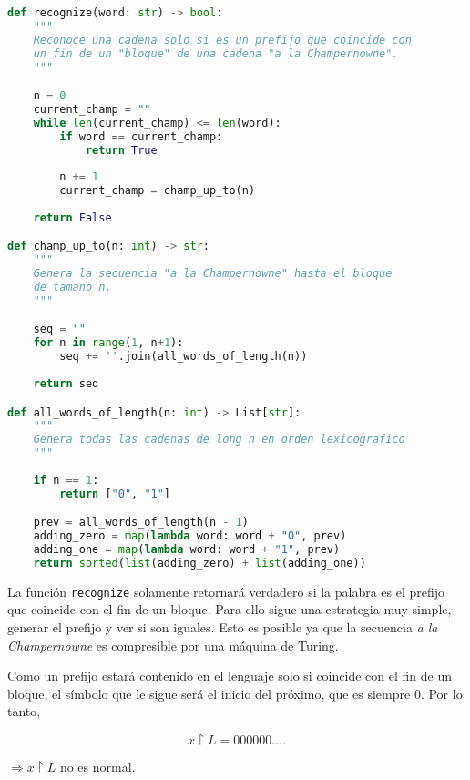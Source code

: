 \documentclass{article}
\theoremstyle{definition} %
\newcommand{\select}{\upharpoonright}
\begin{document}
\lstset{style=mystyle}

\begin{lstlisting}[language=Python, caption=Programa que reconoce las cadenas de $L$]
def recognize(word: str) -> bool:
    """
    Reconoce una cadena solo si es un prefijo que coincide con
    un fin de un "bloque" de una cadena "a la Champernowne".
    """

    n = 0
    current_champ = ""
    while len(current_champ) <= len(word):
        if word == current_champ:
            return True
        
        n += 1
        current_champ = champ_up_to(n)
    
    return False

def champ_up_to(n: int) -> str:
    """
    Genera la secuencia "a la Champernowne" hasta el bloque
    de tamano n.
    """

    seq = ""
    for n in range(1, n+1):
        seq += ''.join(all_words_of_length(n))
    
    return seq

def all_words_of_length(n: int) -> List[str]:
    """
    Genera todas las cadenas de long n en orden lexicografico
    """
    
    if n == 1:
        return ["0", "1"]

    prev = all_words_of_length(n - 1)
    adding_zero = map(lambda word: word + "0", prev)
    adding_one = map(lambda word: word + "1", prev)
    return sorted(list(adding_zero) + list(adding_one))
\end{lstlisting}
    
La función \texttt{recognize} solamente retornará verdadero si la palabra es el
prefijo que coincide con el fin de un bloque. Para ello sigue una estrategia muy
simple, generar el prefijo y ver si son iguales. Esto es posible ya que la
secuencia \textit{a la Champernowne} es compresible por una máquina de Turing.

Como un prefijo estará contenido en el lenguaje solo si coincide con el fin
de un bloque, el símbolo que le sigue será el inicio del próximo, que es siempre
0. Por lo tanto,

$$x \select L = 000000\dots.$$

$\Rightarrow x \select L$ no es normal.
\end{document}
